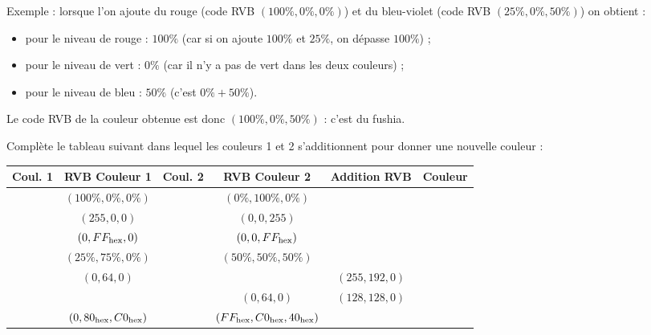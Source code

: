 \documentclass[class=report,crop=false, 12pt]{standalone}
\begin{document}
\begin{activite}
\begin{enumerate}
Exemple : lorsque l'on ajoute du rouge (code RVB $(100\%,0\%,0\%)$) et du bleu-violet (code RVB $(25\%,0\%,50\%)$)
on obtient :
\begin{itemize}
  \item pour le niveau de rouge : $100\%$ (car si on ajoute $100\%$ et $25\%$, on dépasse $100\%$) ;
  
  \item pour le niveau de vert : $0\%$ (car il n'y a pas de vert dans les deux couleurs) ;
  
  \item pour le niveau de bleu : $50\%$ (c'est $0\%+50\%$).
\end{itemize}
Le code RVB de la couleur obtenue est donc $(100\%, 0\%,50\%)$ : c'est du fushia.



Complète le tableau suivant dans lequel les couleurs 1 et 2 s'additionnent pour donner une nouvelle couleur :


\begin{center}
\begin{tabular}{|c|c|c|c|c|c|}
\hline
Coul. 1 &  RVB Couleur 1  & Coul. 2 & RVB Couleur 2 & Addition RVB & Couleur \\ \hline
\cellcolor{red}  & $(100\%,0\%,0\%)$ & \cellcolor{green} & $(0\%,100\%,0\%)$ &  & \cellcolor{yellow} \\ \hline
\cellcolor{red}  & $(255,0,0)$       & \cellcolor{blue}   & $(0,0,255)$       &   & \\ \hline
                 & $(0,FF_{\text{hex}},0)$  &                    & $(0,0,FF_{\text{hex}})$   &   & \\ \hline
 & $(25\%,75\%,0\%)$ & & $(50\%,50\%,50\%)$ & & \\ \hline                   
 & $(0,64,0)$ &  & & $(255,192,0)$ & \\ \hline
 &  &  & $(0,64,0)$ & $(128,128,0)$ & \\ \hline     
 & $(0,80_{\text{hex}},C0_{\text{hex}})$ & & $(FF_{\text{hex}},C0_{\text{hex}},40_{\text{hex}})$ & & \\ \hline            
\end{tabular}
\end{center} 
\end{enumerate}

\end{activite}
\end{document}
